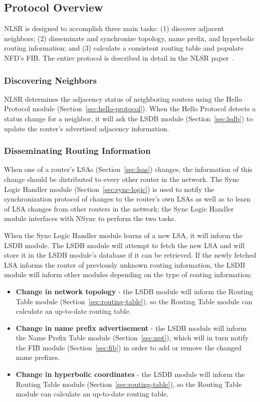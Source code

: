 \subsection{Protocol Overview}
\label{sec:protocol-overview}

NLSR is designed to accomplish three main tasks: (1) discover adjacent neighbors; (2) disseminate and synchronize topology, name prefix, and hyperbolic routing information; and (3) calculate a consistent routing table and populate NFD's FIB.
The entire protocol is described in detail in the NLSR paper~\cite{NlsrTr}.

\subsubsection{Discovering Neighbors}

NLSR determines the adjacency status of neighboring routers using the Hello Protocol module (Section~\ref{sec:hello-protocol}).
When the Hello Protocol detects a status change for a neighbor, it will ask the LSDB module (Section~\ref{sec:lsdb}) to update the router's advertised adjacency information.

\subsubsection{Disseminating Routing Information}

When one of a router's LSAs (Section~\ref{sec:lsas}) changes, the information of this change should be distributed to every other router in the network.
The Sync Logic Handler module (Section~\ref{sec:sync-logic}) is used to notify the synchronization protocol of changes to the router's own LSAs as well as to learn of LSA changes from other routers in the network;
the Sync Logic Handler module interfaces with NSync to perform the two tasks.

When the Sync Logic Handler module learns of a new LSA, it will inform the LSDB module.
The LSDB module will attempt to fetch the new LSA and will store it in the LSDB module's database if it can be retrieved.
If the newly fetched LSA informs the router of previously unknown routing information, the LSDB module will inform other modules depending on the type of routing information:
\begin{itemize}
\item \textbf{Change in network topology} - the LSDB module will inform the Routing Table module (Section~\ref{sec:routing-table}), so the Routing Table module can calculate an up-to-date routing table.
\item \textbf{Change in name prefix advertisement} - the LSDB module will inform the Name Prefix Table module (Section~\ref{sec:npt}), which will in turn notify the FIB module (Section~\ref{sec:fib}) in order to add or remove the changed name prefixes.
\item \textbf{Change in hyperbolic coordinates} - the LSDB module will inform the Routing Table module (Section~\ref{sec:routing-table}), so the Routing Table module can calculate an up-to-date routing table.
\end{itemize}

